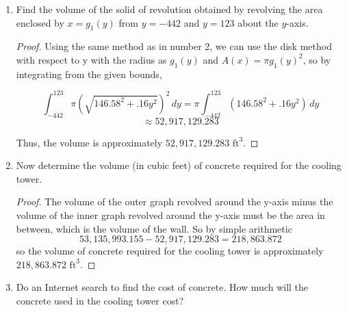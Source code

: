 \documentclass{article}
\begin{document}
\begin{enumerate}
\begin{proof}
Now we know that $x=g_1(y)=\sqrt{146.58^2+ry^2}$, and we also know a few points on the right branch of the hyperbola. Thus, we can plug in these points to solve for $r$
\begin{align*}
    154.58&=\sqrt{146.58^2+r(123)^2}\\
    154.58^2&=146.58^2+r(123)^2\\
    154.58^2-146.58^2&=r(123)^2\\
    \frac{154.58^2-146.58^2}{123^2}&=r\\
    r&=\frac{154.58^2-146.58^2}{123^2}\\
    r&\approx0.16
\end{align*}

Thus it has been shown that $q=146.58$ and $r\approx0.16.$



\end{proof}
\item Find the volume of the solid of revolution obtained by revolving the area enclosed by $x =
g_1(y)$ from $y = -442$ and $y = 123$ about the $y$-axis.

\begin{proof}

Using the same method as in number 2, we can use the disk method with respect to y with the radius as $g_1(y)$ and $A(x) = \pi g_1(y)^2$, so by integrating from the given bounds,

$$ \int_{-442}^{123} \pi(\sqrt{146.58^2+.16y^2})^2 \,dy = \pi \int_{-442}^{123} (146.58^2+.16y^2) \,dy $$ $$\approx 52,917,129.283$$

Thus, the volume is approximately $\boxed{52,917,129.283\text{ ft}^3}$. 
\end{proof}

\item Now determine the volume (in cubic feet) of concrete required for the cooling tower.

\begin{proof}
The volume of the outer graph revolved around the y-axis minus the volume of the inner graph revolved around the y-axis must be the area in between, which is the volume of the wall. So by simple arithmetic
    $$53,135,993.155 - 52,917,129.283 = 218,863.872$$ 
so the volume of concrete required for the cooling tower is approximately $\boxed{218,863.872\text{ ft}^3}$.
\end{proof}


\item Do an Internet search to find the cost of concrete. How much will the concrete used in the cooling tower cost?


\end{enumerate}
\end{document}
